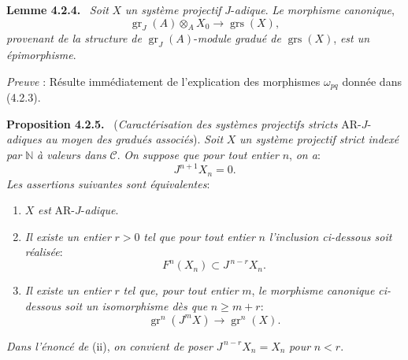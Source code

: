 \documentclass[11pt]{article}
\newenvironment{statement}[1]{\par\medskip\noindent\textbf{#1.}\ }{\par\medskip}
\providecommand{\gr}{\operatorname{gr}}
\providecommand{\gr}{\operatorname{gr}}
\providecommand{\gr}{\operatorname{gr}}
\providecommand{\grs}{\operatorname{grs}}
\begin{document}
\begin{statement}{Lemme 4.2.4}
\emph{Soit} \(X\) \emph{un système projectif} \(J\)-\emph{adique}. \emph{Le morphisme canonique},
\[
\gr_J(A)\otimes_A X_0\longrightarrow \grs(X),
\]
\emph{provenant de la structure de} \(\gr_J(A)\)-\emph{module gradué de} \(\grs(X)\), \emph{est un épimorphisme}.
\end{statement}

\emph{Preuve} : Résulte immédiatement de l'explication des morphismes \(\omega_{pq}\) donnée dans (4.2.3).

\begin{statement}{Proposition 4.2.5}
(\emph{Caractérisation des systèmes projectifs stricts} AR-\(J\)-\emph{adiques au moyen des gradués associés}).
\emph{Soit} \(X\) \emph{un système projectif strict indexé par} \(\mathbb N\) \emph{à valeurs dans} \(\mathcal C\). \emph{On suppose que pour tout entier} \(n\), \emph{on a}:
\[
J^{n+1}X_n=0.
\]
\emph{Les assertions suivantes sont équivalentes}:
\begin{enumerate}[label=\textup{(\roman*)}]
\item \(X\) \emph{est} AR-\(J\)-\emph{adique}.
\item \emph{Il existe un entier} \(r>0\) \emph{tel que pour tout entier} \(n\) \emph{l'inclusion ci-dessous soit réalisée}:
\[
F^n(X_n)\subset J^{\,n-r}X_n.
\]
\item \emph{Il existe un entier} \(r\) \emph{tel que, pour tout entier} \(m\), \emph{le morphisme canonique ci-dessous soit un isomorphisme dès que} \(n\ge m+r\):
\[
\gr^n(J^mX)\longrightarrow \gr^n(X).
\]
\end{enumerate}
\emph{Dans l'énoncé de} (ii), \emph{on convient de poser} \(J^{\,n-r}X_n=X_n\) \emph{pour} \(n<r\).
\end{statement}
\end{document}
